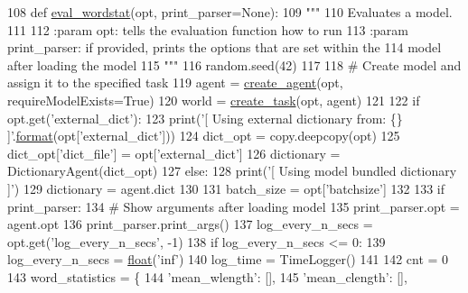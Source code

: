\begin{DoxyCode}
108 \textcolor{keyword}{def }\hyperlink{namespaceprojects_1_1controllable__dialogue_1_1eval__wordstat_aa89fea1e83d255fa77e81e73a7d81161}{eval\_wordstat}(opt, print\_parser=None):
109     \textcolor{stringliteral}{"""}
110 \textcolor{stringliteral}{    Evaluates a model.}
111 \textcolor{stringliteral}{}
112 \textcolor{stringliteral}{    :param opt: tells the evaluation function how to run}
113 \textcolor{stringliteral}{    :param print\_parser: if provided, prints the options that are set within the}
114 \textcolor{stringliteral}{        model after loading the model}
115 \textcolor{stringliteral}{    """}
116     random.seed(42)
117 
118     \textcolor{comment}{# Create model and assign it to the specified task}
119     agent = \hyperlink{namespaceparlai_1_1core_1_1agents_ad0d54074d4bcc148bb415ab5515a53b5}{create\_agent}(opt, requireModelExists=\textcolor{keyword}{True})
120     world = \hyperlink{namespaceparlai_1_1core_1_1worlds_a11923c10b545c7ecc1b08fe2242d9c2c}{create\_task}(opt, agent)
121 
122     \textcolor{keywordflow}{if} opt.get(\textcolor{stringliteral}{'external\_dict'}):
123         print(\textcolor{stringliteral}{'[ Using external dictionary from: \{\} ]'}.\hyperlink{namespaceparlai_1_1chat__service_1_1services_1_1messenger_1_1shared__utils_a32e2e2022b824fbaf80c747160b52a76}{format}(opt[\textcolor{stringliteral}{'external\_dict'}]))
124         dict\_opt = copy.deepcopy(opt)
125         dict\_opt[\textcolor{stringliteral}{'dict\_file'}] = opt[\textcolor{stringliteral}{'external\_dict'}]
126         dictionary = DictionaryAgent(dict\_opt)
127     \textcolor{keywordflow}{else}:
128         print(\textcolor{stringliteral}{'[ Using model bundled dictionary ]'})
129         dictionary = agent.dict
130 
131     batch\_size = opt[\textcolor{stringliteral}{'batchsize'}]
132 
133     \textcolor{keywordflow}{if} print\_parser:
134         \textcolor{comment}{# Show arguments after loading model}
135         print\_parser.opt = agent.opt
136         print\_parser.print\_args()
137     log\_every\_n\_secs = opt.get(\textcolor{stringliteral}{'log\_every\_n\_secs'}, -1)
138     \textcolor{keywordflow}{if} log\_every\_n\_secs <= 0:
139         log\_every\_n\_secs = \hyperlink{namespaceprojects_1_1controllable__dialogue_1_1make__control__dataset_aa2b7207688c641dbc094ab44eca27113}{float}(\textcolor{stringliteral}{'inf'})
140     log\_time = TimeLogger()
141 
142     cnt = 0
143     word\_statistics = \{
144         \textcolor{stringliteral}{'mean\_wlength'}: [],
145         \textcolor{stringliteral}{'mean\_clength'}: [],

\end{DoxyCode}

